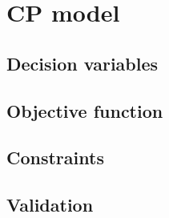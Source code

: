 \section{CP model}


\subsection{Decision variables}


\subsection{Objective function}


\subsection{Constraints}


\subsection{Validation}